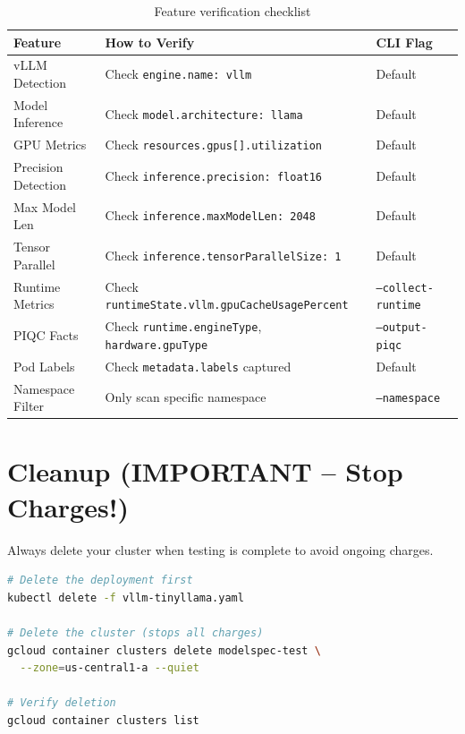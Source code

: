 \documentclass[11pt,a4paper]{article}
\begin{document}
\begin{table}[h]
\centering
\small
\begin{tabular}{@{}lll@{}}
\toprule
\textbf{Feature} & \textbf{How to Verify} & \textbf{CLI Flag} \\
\midrule
vLLM Detection & Check \texttt{engine.name: vllm} & Default \\
Model Inference & Check \texttt{model.architecture: llama} & Default \\
GPU Metrics & Check \texttt{resources.gpus[].utilization} & Default \\
Precision Detection & Check \texttt{inference.precision: float16} & Default \\
Max Model Len & Check \texttt{inference.maxModelLen: 2048} & Default \\
Tensor Parallel & Check \texttt{inference.tensorParallelSize: 1} & Default \\
Runtime Metrics & Check \texttt{runtimeState.vllm.gpuCacheUsagePercent} & \texttt{--collect-runtime} \\
PIQC Facts & Check \texttt{runtime.engineType}, \texttt{hardware.gpuType} & \texttt{--output-piqc} \\
Pod Labels & Check \texttt{metadata.labels} captured & Default \\
Namespace Filter & Only scan specific namespace & \texttt{--namespace} \\
\bottomrule
\end{tabular}
\caption{Feature verification checklist}
\end{table}

\section{Cleanup (IMPORTANT -- Stop Charges!)}

\begin{tcolorbox}[colback=warnred,colframe=red!50!black,title=\textbf{Important: Cleanup to Stop Charges}]
Always delete your cluster when testing is complete to avoid ongoing charges.
\end{tcolorbox}

\begin{lstlisting}[language=bash]
# Delete the deployment first
kubectl delete -f vllm-tinyllama.yaml

# Delete the cluster (stops all charges)
gcloud container clusters delete modelspec-test \
  --zone=us-central1-a --quiet

# Verify deletion
gcloud container clusters list
\end{lstlisting}
\end{document}
